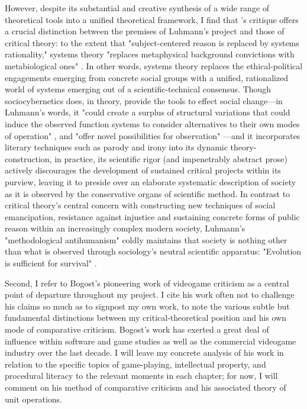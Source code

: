 However, despite its substantial and creative synthesis of a wide range of theoretical tools into a unified theoretical framework, I find that \citeauthor{Habermas-bfn}'s critique offers a crucial distinction between the premises of Luhmann's project and those of critical theory: to the extent that "subject-centered reason is replaced by systems rationality," systems theory "replaces metaphysical background convictions with metabiological ones" \autocite*[385]{Habermas1987-yd}. In other words, systems theory replaces the ethical-political engagements emerging from concrete social groups with a unified, rationalized world of systems emerging out of a scientific-technical consensus. Though sociocybernetics does, in theory, provide the tools to effect social change---in Luhmann's words, it "could create a surplus of structural variations that could induce the observed function systems to consider alternatives to their own modes of operation" \autocite*[136]{Luhmann1994-qz}, and "offer novel possibilities for observation" \autocite[138]{Luhmann1994-qz}---and it incorporates literary techniques such as parody and irony into its dynamic theory-construction, in practice, its scientific rigor (and impenetrably abstract prose) actively discourages the development of sustained critical projects within its purview, leaving it to preside over an elaborate systematic description of society as it is observed by the conservative organs of scientific method. In contrast to critical theory's central concern with constructing new techniques of social emancipation, resistance against injustice and sustaining concrete forms of public reason within an increasingly complex modern society, Luhmann's "methodological antihumanism" \autocite[378]{Habermas1987-yd} coldly maintains that society is nothing other than what is observed through sociology's neutral scientific apparatus: "Evolution is sufficient for survival" \autocite[Luhmann, qtd. in][377]{Habermas1987-yd}.

Second, I refer to Bogost's pioneering work of videogame criticism as a central point of departure throughout my project. I cite his work often not to challenge his claims so much as to signpost my own work, to note the various subtle but fundamental distinctions between my critical-theoretical position and his own mode of comparative criticism. Bogost's work has exerted a great deal of influence within software and game studies as well as the commercial videogame industry over the last decade. I will leave my concrete analysis of his work in relation to the specific topics of game-playing, intellectual property, and procedural literacy to the relevant moments in each chapter; for now, I will comment on his method of comparative criticism and his associated theory of unit operations.

